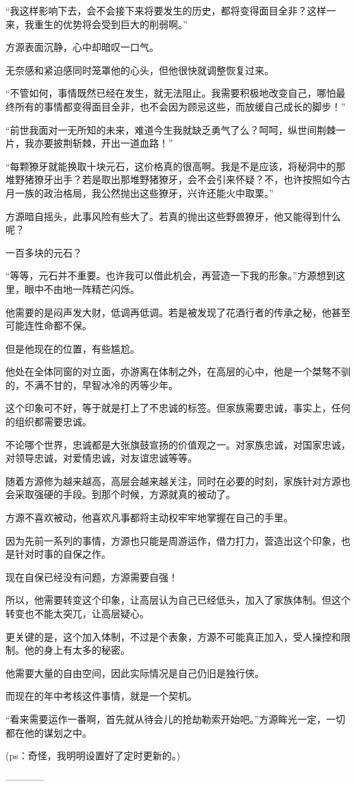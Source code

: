 \begin{this_body}
“我这样影响下去，会不会接下来将要发生的历史，都将变得面目全非？这样一来，我重生的优势将会受到巨大的削弱啊。”

方源表面沉静，心中却暗叹一口气。

无奈感和紧迫感同时笼罩他的心头，但他很快就调整恢复过来。

“不管如何，事情既然已经在发生，就无法阻止。我需要积极地改变自己，哪怕最终所有的事情都变得面目全非，也不会因为顾忌这些，而放缓自己成长的脚步！”

“前世我面对一无所知的未来，难道今生我就缺乏勇气了么？呵呵，纵世间荆棘一片，我亦要披荆斩棘，开出一道血路！”

“每颗獠牙就能换取十块元石，这价格真的很高啊。我是不是应该，将秘洞中的那堆野猪獠牙出手？若是取出那堆野猪獠牙，会不会引来怀疑？不，也许按照如今古月一族的政治格局，我公然抛出这些獠牙，兴许还能火中取栗。”

方源暗自摇头，此事风险有些大了。若真的抛出这些野兽獠牙，他又能得到什么呢？

一百多块的元石？

“等等，元石并不重要。也许我可以借此机会，再营造一下我的形象。”方源想到这里，眼中不由地一阵精芒闪烁。

他需要的是闷声发大财，低调再低调。若是被发现了花酒行者的传承之秘，他甚至可能连性命都不保。

但是他现在的位置，有些尴尬。

他处在全体同窗的对立面，亦游离在体制之外，在高层的心中，他是一个桀骜不驯的，不满不甘的，早智冰冷的丙等少年。

这个印象可不好，等于就是打上了不忠诚的标签。但家族需要忠诚，事实上，任何的组织都需要忠诚。

不论哪个世界，忠诚都是大张旗鼓宣扬的价值观之一。对家族忠诚，对国家忠诚，对领导忠诚，对爱情忠诚，对友谊忠诚等等。

随着方源修为越来越高，高层会越来越关注，同时在必要的时刻，家族针对方源也会采取强硬的手段。到那个时候，方源就真的被动了。

方源不喜欢被动，他喜欢凡事都将主动权牢牢地掌握在自己的手里。

因为先前一系列的事情，方源也只能是周游运作，借力打力，营造出这个印象，也是针对时事的自保之作。

现在自保已经没有问题，方源需要自强！

所以，他需要转变这个印象，让高层认为自己已经低头，加入了家族体制。但这个转变也不能太突兀，让高层疑心。

更关键的是，这个加入体制，不过是个表象，方源不可能真正加入，受人操控和限制。他的身上有太多的秘密。

他需要大量的自由空间，因此实际情况是自己仍旧是独行侠。

而现在的年中考核这件事情，就是一个契机。

“看来需要运作一番啊，首先就从待会儿的抢劫勒索开始吧。”方源眸光一定，一切都在他的谋划之中。

(ps：奇怪，我明明设置好了定时更新的。)

------------

\end{this_body}

